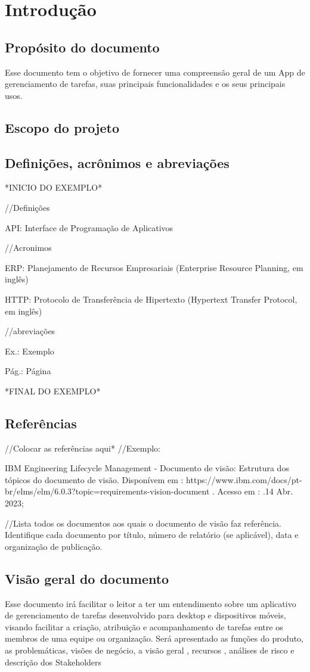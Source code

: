 \chapter{Introdução}
\section{Propósito do documento}
Esse documento tem o objetivo de fornecer uma compreensão geral de um App de gerenciamento de tarefas, suas principais funcionalidades e os seus principais usos.
\section{Escopo do projeto}

\section{Definições, acrônimos e abreviações}
*INICIO DO EXEMPLO*

//Definições

API: Interface de Programação de Aplicativos

//Acronimos

ERP: Planejamento de Recursos Empresariais (Enterprise Resource Planning, em inglês)

HTTP: Protocolo de Transferência de Hipertexto (Hypertext Transfer Protocol, em inglês)

//abreviações

Ex.: Exemplo

Pág.: Página

*FINAL DO EXEMPLO*
\section{Referências}
//Colocar as referências aqui*
//Exemplo:

IBM Engineering Lifecycle Management - Documento de visão: Estrutura dos tópicos do documento de visão.
Disponívem em : https://www.ibm.com/docs/pt-br/elms/elm/6.0.3?topic=requirements-vision-document . Acesso em : .14 Abr. 2023;

//Lista todos os documentos aos quais o documento de visão faz referência. Identifique cada documento por título, número de relatório (se aplicável), data e organização de publicação.
\section{Visão geral do documento}
Esse documento irá facilitar o leitor a ter um entendimento sobre um aplicativo de gerenciamento de tarefas desenvolvido para desktop e dispositivos móveis, visando facilitar a criação, atribuição e acompanhamento de tarefas entre os membros de uma equipe ou organização. Será apresentado as funções do produto, as problemáticas, visões de negócio, a visão geral , recursos , análises de risco e descrição dos Stakeholders


